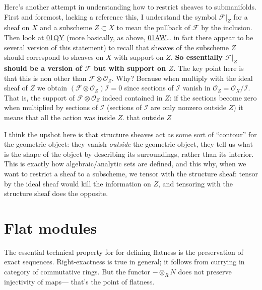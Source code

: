\medskip\noindent
Here's another attempt in understanding how
to restrict sheaves to submanifolds.
First and foremost, lacking a reference this,
I understand the symbol $\mathcal{F}|_Z$ for
a sheaf
on $X$ and a subscheme  $Z \subset X$ to mean
the
pullback of $\mathcal{F}$ by the inclusion.
Then look at
\href{https://stacks.math.columbia.edu/tag/%
01QY}{01QY}
(more basically, as above,
\href{https://stacks.math.columbia.edu/tag/%
01AW}{01AW}…
in fact there appear to be several version of
this statement)
to recall that sheaves of the subscheme $Z$
should correspond
to sheaves on $X$ with support on $Z$.
{\bf So essentially $\mathcal{F}|_Z$ should
be a version of $\mathcal{F}$
but with support on $Z$.}
The key point here is that this is non other
than
$\mathcal{F} \otimes \mathcal{O}_Z$.
Why? Because when multiply with the ideal
sheaf of $Z$ we obtain
$(\mathcal{F} \otimes
\mathcal{O}_Z)\mathcal{I}=0$
since sections of $\mathcal{I}$
vanish in
$\mathcal{O}_Z=\mathcal{O}_X/\mathcal{I}$.
That is, the support of $\mathcal{F} \otimes
\mathcal{O}_Z$ indeed
contained in $Z$: if the sections become zero
when
multiplied by sections of $\mathcal{I}$
(sections of $\mathcal{I}$ are only nonzero
outside $Z$)
it means that all the action was inside $Z$.
that outside $Z$

I think the upshot here is that structure
sheaves
act as some sort of ``contour'' for the
geometric object:
they vanish {\it outside} the geometric
object,
they tell us what is the shape of the object
by describing its surroundings, rather than
its interior.
This is exactly how algebraic/analytic sets
are defined,
and this why, when we want to restrict a
sheaf
to a subscheme, we tensor with the structure
sheaf:
tensor by the ideal sheaf would kill the
information on $Z$,
and tensoring with the structure sheaf does
the opposite.













\section{Flat modules}
\label{section-flat-modules}

\noindent
The essential technical property
for for defining flatness
is the preservation of exact sequences.
Right-exactness is true in general;
it follows from currying in category
of commutative rings.
But the functor $-\otimes_R N$ does not
preserve injectivity of maps---
that's the point of flatness.

